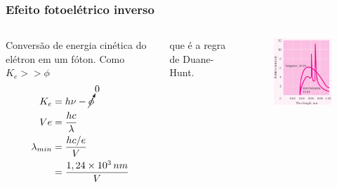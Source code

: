 \documentclass[12pt,brazil]{beamer}
\begin{document}

\begin{frame}
  \frametitle{Efeito fotoelétrico inverso}
    \begin{columns}[c]


      \column{6cm}        
      \fontsize{8pt}{11pt}\selectfont
      
      Conversão de energia cinética do elétron em um fóton. Como $K_e >> \phi$
      \begin{align*}
        K_e &= h\nu - \cancelto{0}{\phi}\\
        Ve &= \dfrac{hc}{\lambda}\\
        \lambda_{min} &= \dfrac{hc/e}{V}\\
        &= \dfrac{1,24\times 10^3\, nm}{V}        
      \end{align*}
      
      que é a regra de Duane-Hunt.
      
      \column{4cm}
        \vspace*{-0.75cm}
        \begin{figure}
          \includegraphics[width=4.5cm]{figuras/fig17}
        \end{figure}
    \end{columns}  

\end{frame}

\end{document}

